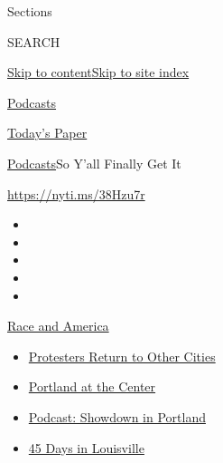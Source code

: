Sections

SEARCH

\protect\hyperlink{site-content}{Skip to
content}\protect\hyperlink{site-index}{Skip to site index}

\href{https://www.nytimes3xbfgragh.onion/spotlight/podcasts}{Podcasts}

\href{https://myaccount.nytimes3xbfgragh.onion/auth/login?response_type=cookie\&client_id=vi}{}

\href{https://www.nytimes3xbfgragh.onion/section/todayspaper}{Today's
Paper}

\href{/spotlight/podcasts}{Podcasts}\textbar{}So Y'all Finally Get It

\url{https://nyti.ms/38Hzu7r}

\begin{itemize}
\item
\item
\item
\item
\item
\end{itemize}

\href{https://www.nytimes3xbfgragh.onion/news-event/george-floyd-protests-minneapolis-new-york-los-angeles?action=click\&pgtype=Article\&state=default\&region=TOP_BANNER\&context=storylines_menu}{Race
and America}

\begin{itemize}
\tightlist
\item
  \href{https://www.nytimes3xbfgragh.onion/2020/07/26/us/protests-portland-seattle-trump.html?action=click\&pgtype=Article\&state=default\&region=TOP_BANNER\&context=storylines_menu}{Protesters
  Return to Other Cities}
\item
  \href{https://www.nytimes3xbfgragh.onion/2020/07/24/us/portland-oregon-protests-white-race.html?action=click\&pgtype=Article\&state=default\&region=TOP_BANNER\&context=storylines_menu}{Portland
  at the Center}
\item
  \href{https://www.nytimes3xbfgragh.onion/2020/07/23/podcasts/the-daily/portland-protests.html?action=click\&pgtype=Article\&state=default\&region=TOP_BANNER\&context=storylines_menu}{Podcast:
  Showdown in Portland}
\item
  \href{https://www.nytimes3xbfgragh.onion/interactive/2020/07/16/us/black-lives-matter-protests-louisville-breonna-taylor.html?action=click\&pgtype=Article\&state=default\&region=TOP_BANNER\&context=storylines_menu}{45
  Days in Louisville}
\end{itemize}

